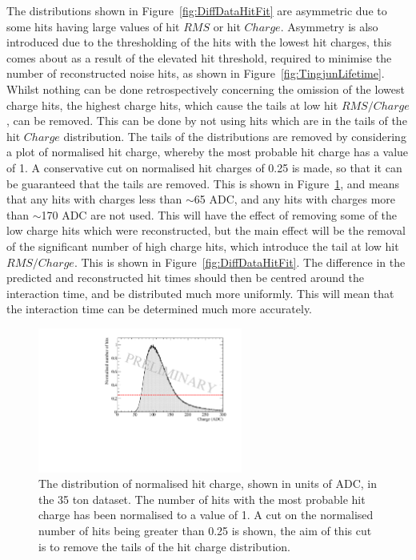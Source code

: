 The distributions shown in Figure~\ref{fig:DiffDataHitFit} are asymmetric due to some hits having large values of hit $RMS$ or hit $Charge$. Asymmetry is also introduced due to the thresholding of the hits with the lowest hit charges, this comes about as a result of the elevated hit threshold, required to minimise the number of reconstructed noise hits, as shown in Figure~\ref{fig:TingjunLifetime}. Whilst nothing can be done retrospectively concerning the omission of the lowest charge hits, the highest charge hits, which cause the tails at low hit $RMS/Charge$, can be removed. This can be done by not using hits which are in the tails of the hit $Charge$ distribution. The tails of the distributions are removed by considering a plot of normalised hit charge, whereby the most probable hit charge has a value of 1. A conservative cut on normalised hit charges of 0.25 is made, so that it can be guaranteed that the tails are removed. This is shown in Figure~\ref{fig:DiffData_ChargeCut}, and means that any hits with charges less than $\sim$65 ADC, and any hits with charges more than $\sim$170 ADC are not used. This will have the effect of removing some of the low charge hits which were reconstructed, but the main effect will be the removal of the significant number of high charge hits, which introduce the tail at low hit $RMS/Charge$. This is shown in Figure~\ref{fig:DiffDataHitFit}. The difference in the predicted and reconstructed hit times should then be centred around the interaction time, and be distributed much more uniformly. This will mean that the interaction time can be determined much more accurately. \\

\begin{figure}[h!]
  \centering
  \includegraphics[width=0.6\textwidth]{ChargeCutData}
  \caption[The distribution of normalised hit charge in the 35 ton dataset]
          {The distribution of normalised hit charge, shown in units of ADC, in the 35 ton dataset. The number of hits with the most probable hit charge has been normalised to a value of 1. A cut on the normalised number of hits being greater than 0.25 is shown, the aim of this cut is to remove the tails of the hit charge distribution.}
  \label{fig:DiffData_ChargeCut}
\end{figure}

